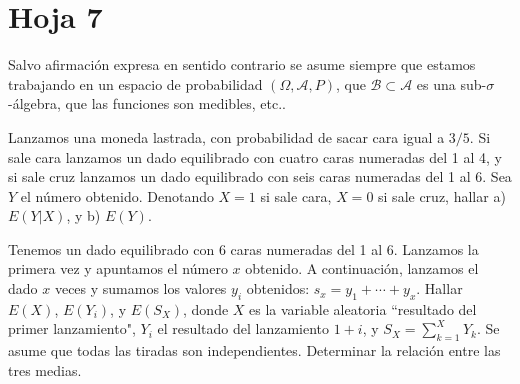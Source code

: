 

\newpage
\section{Hoja 7}

Salvo afirmaci\'on expresa en sentido
contrario se asume siempre que estamos trabajando en un espacio de probabilidad $(\Omega, \mathcal{A}, P)$,
que  $\mathcal{B}\subset \mathcal{A}$ es una sub-$\sigma$-\'algebra, que las funciones son medibles, etc..


\begin{problem}[1] Lanzamos una moneda lastrada, con probabilidad de sacar cara
igual a $3/5$. Si sale cara lanzamos un dado equilibrado con cuatro
caras numeradas del 1 al 4, y si sale cruz lanzamos un dado
equilibrado con seis caras numeradas del 1 al 6. Sea $Y$ el n\'umero
obtenido. Denotando $X=1$ si sale cara, $X=0$ si sale cruz, hallar
a) $E(Y|X)$, y  b) $E(Y)$.
\solution

\begin{expla}

\end{expla}

\end{problem}


\begin{problem}[2] Tenemos un dado equilibrado con 6 caras numeradas del 1 al 6. Lanzamos la  primera vez y 
apuntamos el n\'umero $x$ obtenido. A continuaci\'on, 
lanzamos el dado $x$ veces y sumamos los valores $y_i$ obtenidos: $s_x = y_1 + \cdots  + y_x$.
Hallar $E(X)$, $E(Y_i)$, y $E(S_X)$, donde $X$ es la variable aleatoria ``resultado del primer lanzamiento", $Y_i$ el resultado del lanzamiento
$ 1 + i$, y $S_X = \sum_{k = 1}^X Y_k$. Se asume que todas
las tiradas son independientes. 
Determinar la relaci\'on entre las tres medias.
\solution

\begin{expla}

\end{expla}

\end{problem}



